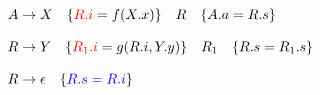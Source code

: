 
\begin{align*}
  A &\to X \quad \{\textcolor{red}{R.i} = f(X.x)\} \quad R \quad \{A.a = R.s\} \\[8pt]
  R &\to Y \quad \{\textcolor{red}{R_{1}.i} = g(R.i, Y.y)\} \quad R_{1} \quad \{R.s = R_{1}.s\} \\[8pt]
  R &\to \epsilon \quad \{\textcolor{blue}{R.s = R.i}\}
\end{align*}